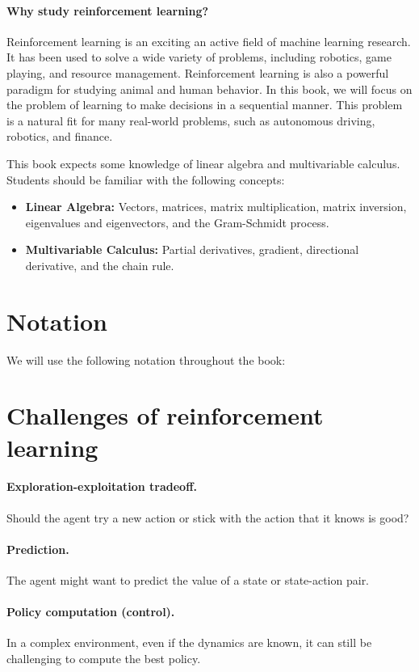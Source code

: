 \documentclass[../main/main]{subfiles}
\begin{document}
\paragraph{Why study reinforcement learning?} Reinforcement learning is an exciting an active field of machine learning research. It has been used to solve a wide variety of problems, including robotics, game playing, and resource management. Reinforcement learning is also a powerful paradigm for studying animal and human behavior. In this book, we will focus on the problem of learning to make decisions in a sequential manner. This problem is a natural fit for many real-world problems, such as autonomous driving, robotics, and finance.


This book expects some knowledge of linear algebra and multivariable calculus. Students should be familiar with the following concepts:

\begin{itemize}
    \item \textbf{Linear Algebra:} Vectors, matrices, matrix multiplication, matrix inversion, eigenvalues and eigenvectors, and the Gram-Schmidt process.
    \item \textbf{Multivariable Calculus:} Partial derivatives, gradient, directional derivative, and the chain rule.
\end{itemize}


\section{Notation}

We will use the following notation throughout the book:


\section{Challenges of reinforcement learning}

\paragraph{Exploration-exploitation tradeoff.} Should the agent try a new action or stick with the action that it knows is good?

\paragraph{Prediction.} The agent might want to predict the value of a state or state-action pair.

\paragraph{Policy computation (control).} In a complex environment, even if the dynamics are known, it can still be challenging to compute the best policy.
\end{document}
